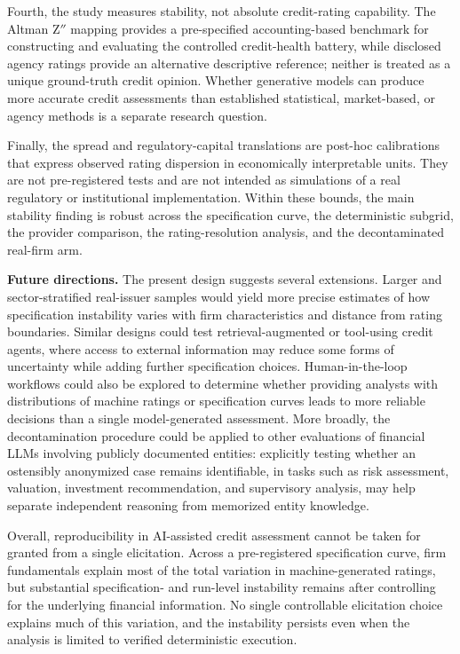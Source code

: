 \documentclass[pdflatex,sn-nature,lineno]{sn-jnl}
\theoremstyle{thmstyleone}
\begin{document}
Fourth, the study measures stability, not absolute credit-rating capability. The Altman Z$''$ mapping
provides a pre-specified accounting-based benchmark for constructing and evaluating the controlled
credit-health battery, while disclosed agency ratings provide an alternative descriptive reference;
neither is treated as a unique ground-truth credit opinion. Whether generative models can produce more
accurate credit assessments than established statistical, market-based, or agency methods is a separate
research question.

Finally, the spread and regulatory-capital translations are post-hoc calibrations that express observed
rating dispersion in economically interpretable units. They are not pre-registered tests and are not
intended as simulations of a real regulatory or institutional implementation. Within these bounds, the
main stability finding is robust across the specification curve, the deterministic subgrid, the provider
comparison, the rating-resolution analysis, and the decontaminated real-firm arm.

\noindent\textbf{Future directions.} The present design suggests several extensions. Larger and sector-stratified real-issuer samples would
yield more precise estimates of how specification instability varies with firm characteristics and
distance from rating boundaries. Similar designs could test retrieval-augmented or tool-using credit
agents, where access to external information may reduce some forms of uncertainty while adding further
specification choices. Human-in-the-loop workflows could also be explored to determine whether providing
analysts with distributions of machine ratings or specification curves leads to more reliable decisions
than a single model-generated assessment. More broadly, the decontamination procedure could be applied to
other evaluations of financial LLMs involving publicly documented entities: explicitly testing whether an
ostensibly anonymized case remains identifiable, in tasks such as risk assessment, valuation, investment
recommendation, and supervisory analysis, may help separate independent reasoning from memorized entity
knowledge.

Overall, reproducibility in AI-assisted credit assessment cannot be taken for granted from a
single elicitation. Across a pre-registered specification curve, firm fundamentals explain most of the
total variation in machine-generated ratings, but substantial specification- and run-level instability
remains after controlling for the underlying financial information. No single controllable elicitation
choice explains much of this variation, and the instability persists even when the analysis is limited to
verified deterministic execution.
\end{document}
